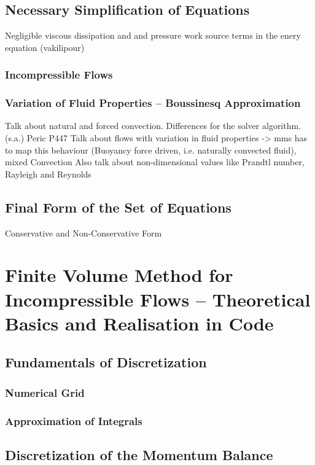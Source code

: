 \documentclass[article,type=msc,colorback,accentcolor=tud2a]{tudthesis}
\begin{document}
    \subsection{Necessary Simplification of Equations}
        Negligible viscous dissipation and and pressure work source terms in the enery equation (vakilipour)
      \subsubsection{Incompressible Flows}
      \subsubsection{Variation of Fluid Properties -- Boussinesq Approximation}
      Talk about natural and forced convection. Differences for the solver algorithm. (s.a.) Peric P447
      Talk about flows with variation in fluid properties -> mms has to map this behaviour (Buoyancy force driven, i.e. naturally convected fluid), mixed Convection
      Also talk about non-dimensional values like Prandtl number, Rayleigh and Reynolds
    \subsection{Final Form of the Set of Equations}
        Conservative and Non-Conservative Form

  \section{Finite Volume Method for Incompressible Flows -- Theoretical Basics and Realisation in Code}

    \subsection{Fundamentals of Discretization}
      
      \subsubsection{Numerical Grid}
      \subsubsection{Approximation of Integrals}

    \subsection{Discretization of the Momentum Balance}
      
\end{document}
